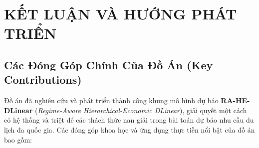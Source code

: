 \chapter{KẾT LUẬN VÀ HƯỚNG PHÁT TRIỂN}
\label{ch:conclusion}

\section{Các Đóng Góp Chính Của Đồ Án (Key Contributions)}
\label{sec:conclusion_contributions}

Đồ án đã nghiên cứu và phát triển thành công khung mô hình dự báo \textbf{RA-HE-DLinear} (\textit{Regime-Aware Hierarchical-Economic DLinear}), giải quyết một cách có hệ thống và triệt để các thách thức nan giải trong bài toán dự báo nhu cầu du lịch đa quốc gia. Các đóng góp khoa học và ứng dụng thực tiễn nổi bật của đồ án bao gồm:

